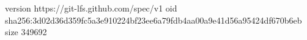 version https://git-lfs.github.com/spec/v1
oid sha256:3d02d36d359fc5a3e910224bf23ee6a79fdb4aa00a9e41d56a95424df670b6eb
size 349692
